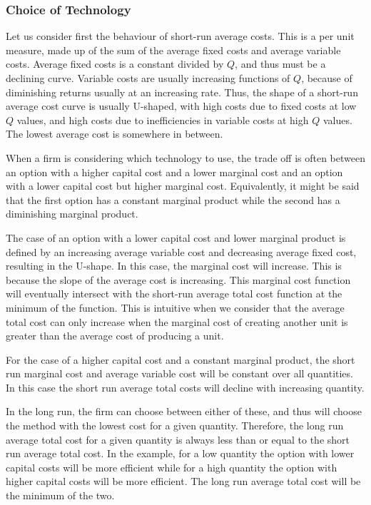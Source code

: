 \documentclass[12pt]{report}
\begin{document}
\begin{flushleft}
\subsubsection*{Choice of Technology}
Let us consider first the behaviour of short-run average costs. This is a per
unit measure, made up of the sum of the average fixed costs and average 
variable costs. Average fixed costs is a constant divided by \(Q\), and thus
must be a declining curve. Variable costs are usually increasing functions of
\(Q\), because of diminishing returns usually at an increasing rate. Thus, the
shape of a short-run average cost curve is usually U-shaped, with high costs
due to fixed costs at low \(Q\) values, and high costs due to inefficiencies
in variable costs at high \(Q\) values. The lowest average cost is somewhere
in between.

\bigskip
When a firm is considering which technology to use, the trade off is often 
between an option with a higher capital cost and a lower marginal cost and an
option with a lower capital cost but higher marginal cost. Equivalently, it
might be said that the first option has a constant marginal product while the
second has a diminishing marginal product.

\bigskip
The case of an option with a lower capital cost and lower marginal product is
defined by an increasing average variable cost and decreasing average fixed
cost, resulting in the U-shape. In this case, the marginal cost will increase.
This is because the slope of the average cost is increasing. This marginal
cost function will eventually intersect with the short-run average total cost
function at the minimum of the function. This is intuitive when we consider
that the average total cost can only increase when the marginal cost of 
creating another unit is greater than the average cost of producing a unit.

\bigskip
For the case of a higher capital cost and a constant marginal product, the
short run marginal cost and average variable cost will be constant over all
quantities. In this case the short run average total costs will decline with
increasing quantity.

\bigskip
In the long run, the firm can choose between either of these, and thus will 
choose the method with the lowest cost for a given quantity. Therefore, the
long run average total cost for a given quantity is always less than or equal
to the short run average total cost. In the example, for a low quantity the
option with lower capital costs will be more efficient while for a high 
quantity the option with higher capital costs will be more efficient. The
long run average total cost will be the minimum of the two.


\end{flushleft}
\end{document}
